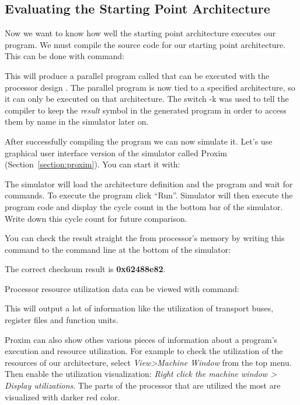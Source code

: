 \documentclass[twoside]{tceusermanual}
\begin{document}
\subsection{Evaluating the Starting Point Architecture}

Now we want to know how well the starting point architecture executes our
program. We must compile the source code for our starting point architecture.
This can be done with command:


This will produce a parallel program called  that can be
executed with the processor design .  The parallel
program is now tied to a specified architecture, so it can only be executed
on that architecture. The switch -k was used to tell the
compiler to keep the \textit{result} symbol in the generated program in order
to access them by name in the simulator later on.

After successfully compiling the program we can now simulate it. Let's use
graphical user interface version of the simulator called Proxim
(Section~\ref{section:proxim}). You can start it with:


The simulator will load the architecture definition and the program and wait
for commands. To execute the program click ``Run''. Simulator will then execute
the program code and display the cycle count in the bottom bar of the
simulator. Write down this cycle count for future comparison.

You can check the result straight the from processor's memory by writing this
command to the command line at the bottom of the simulator:


The correct checksum result is \textbf{0x62488e82}.

Processor resource utilization data can be viewed with command:


This will output a lot of information  like the utilization of transport buses,
register files and function units.

Proxim can also show othes various pieces of information about a program's execution and
resource utilization. For example to check the utilization of the resources of our
architecture, select \textit{View>Machine Window} from the top menu. 
Then enable the utilization visualization: \textit{Right click the machine
window > Display utilizations}. The parts of the processor that are utilized
the most are visualized with darker red color.
\end{document}
